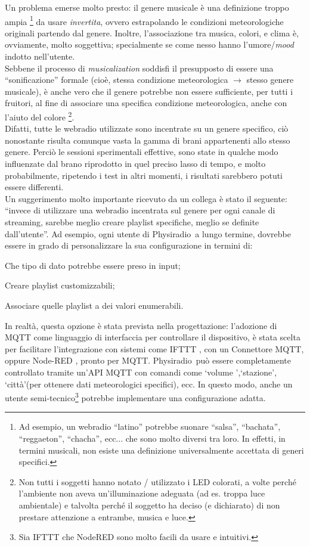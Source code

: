 \documentclass[12pt,a4paper]{report}
\newcommand{\physiradio}{Physiradio} %
\begin{document}
Un problema emerse molto presto: il genere musicale è una definizione troppo ampia \footnote{Ad esempio, un webradio ``latino'' potrebbe suonare ``salsa'', ``bachata'', ``reggaeton'', ``chacha'', ecc... che sono molto diversi tra loro. In effetti, in termini musicali, non esiste una definizione universalmente accettata di generi specifici.} da usare \textit{invertita}, ovvero estrapolando le condizioni meteorologiche originali partendo dal genere. Inoltre, l'associazione tra musica, colori, e clima è, ovviamente, molto soggettiva; specialmente se come nesso hanno l'umore/\textit{mood} indotto nell'utente. \\
Sebbene il processo di \textit{musicalization} soddisfi il presupposto di essere una ``sonificazione'' formale (cioè, stessa condizione meteorologica $\rightarrow$ stesso genere musicale), è anche vero che il genere potrebbe non essere sufficiente, per tutti i fruitori, al fine di associare una specifica condizione meteorologica, anche con l'aiuto del colore \footnote{Non tutti i soggetti hanno notato / utilizzato i LED colorati, a volte perché l'ambiente non aveva un'illuminazione adeguata (ad es. troppa luce ambientale) e talvolta perché il soggetto ha deciso (e dichiarato) di non prestare attenzione a entrambe, musica e luce.}. \\
Difatti, tutte le webradio utilizzate sono incentrate su un genere specifico, ciò nonostante risulta comunque vasta la gamma di brani appartenenti allo stesso genere. Perciò le sessioni sperimentali effettive, sono state in qualche modo influenzate dal brano riprodotto in quel preciso lasso di tempo, e molto probabilmente, ripetendo i test in altri momenti, i risultati sarebbero potuti essere differenti.\\ 
Un suggerimento molto importante ricevuto da un collega è stato il seguente: ``invece di utilizzare una webradio incentrata sul genere per ogni canale di streaming, sarebbe meglio creare playlist specifiche, meglio se definite dall'utente''. Ad esempio, ogni utente di \physiradio\, a lungo termine, dovrebbe essere in grado di personalizzare la sua configurazione in termini di:
\begin{compactitem}
	\item Che tipo di dato potrebbe essere preso in input;
	\item Creare playlist customizzabili;
	\item Associare quelle playlist a dei valori enumerabili.
\end{compactitem}
In realtà, questa opzione è stata prevista nella progettazione: l'adozione di MQTT come linguaggio di interfaccia per controllare il dispositivo, è stata scelta per facilitare l'integrazione con sistemi come IFTTT \cite{ifttt}, con un Connettore MQTT, oppure Node-RED \cite{nodeRed}, pronto per MQTT. \physiradio\ può essere completamente controllato tramite un'API MQTT con comandi come `volume ',`stazione', `città'(per ottenere dati meteorologici specifici), ecc. In questo modo, anche un utente semi-tecnico\footnote{Sia IFTTT che NodeRED sono molto facili da usare e intuitivi.} potrebbe implementare una configurazione adatta.
\end{document}
